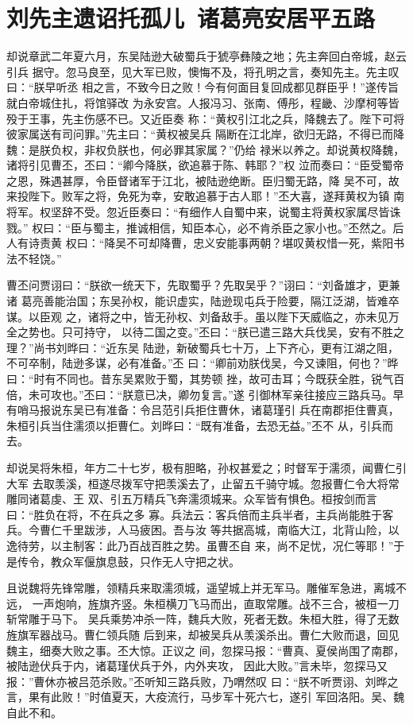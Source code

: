 \chapter{刘先主遗诏托孤儿~诸葛亮安居平五路}

却说章武二年夏六月，东吴陆逊大破蜀兵于猇亭彝陵之地；先主奔回白帝城，赵云引兵
据守。忽马良至，见大军已败，懊悔不及，将孔明之言，奏知先主。先主叹曰：“朕早听丞
相之言，不致今日之败！今有何面目复回成都见群臣乎！”遂传旨就白帝城住扎，将馆驿改
为永安宫。人报冯习、张南、傅彤，程畿、沙摩柯等皆殁于王事，先主伤感不已。又近臣奏
称：“黄权引江北之兵，降魏去了。陛下可将彼家属送有司问罪。”先主曰：“黄权被吴兵
隔断在江北岸，欲归无路，不得已而降魏：是朕负权，非权负朕也，何必罪其家属？”仍给
禄米以养之。却说黄权降魏，诸将引见曹丕，丕曰：“卿今降朕，欲追慕于陈、韩耶？”权
泣而奏曰：“臣受蜀帝之恩，殊遇甚厚，令臣督诸军于江北，被陆逊绝断。臣归蜀无路，降
吴不可，故来投陛下。败军之将，免死为幸，安敢追慕于古人耶！”丕大喜，遂拜黄权为镇
南将军。权坚辞不受。忽近臣奏曰：“有细作人自蜀中来，说蜀主将黄权家属尽皆诛戮。”
权曰：“臣与蜀主，推诚相信，知臣本心，必不肯杀臣之家小也。”丕然之。后人有诗责黄
权曰：“降吴不可却降曹，忠义安能事两朝？堪叹黄权惜一死，紫阳书法不轻饶。”

曹丕问贾诩曰：“朕欲一统天下，先取蜀乎？先取吴乎？”诩曰：“刘备雄才，更兼诸
葛亮善能治国；东吴孙权，能识虚实，陆逊现屯兵于险要，隔江泛湖，皆难卒谋。以臣观
之，诸将之中，皆无孙权、刘备敌手。虽以陛下天威临之，亦未见万全之势也。只可持守，
以待二国之变。”丕曰：“朕已遣三路大兵伐吴，安有不胜之理？”尚书刘晔曰：“近东吴
陆逊，新破蜀兵七十万，上下齐心，更有江湖之阻，不可卒制，陆逊多谋，必有准备。”丕
曰：“卿前劝朕伐吴，今又谏阻，何也？”晔曰：“时有不同也。昔东吴累败于蜀，其势顿
挫，故可击耳；今既获全胜，锐气百倍，未可攻也。”丕曰：“朕意已决，卿勿复言。”遂
引御林军亲往接应三路兵马。早有哨马报说东吴已有准备：令吕范引兵拒住曹休，诸葛瑾引
兵在南郡拒住曹真，朱桓引兵当住濡须以拒曹仁。刘晔曰：“既有准备，去恐无益。”丕不
从，引兵而去。

却说吴将朱桓，年方二十七岁，极有胆略，孙权甚爱之；时督军于濡须，闻曹仁引大军
去取羡溪，桓遂尽拨军守把羡溪去了，止留五千骑守城。忽报曹仁令大将常雕同诸葛虔、王
双、引五万精兵飞奔濡须城来。众军皆有惧色。桓按剑而言曰：“胜负在将，不在兵之多
寡。兵法云：客兵倍而主兵半者，主兵尚能胜于客兵。今曹仁千里跋涉，人马疲困。吾与汝
等共据高城，南临大江，北背山险，以逸待劳，以主制客：此乃百战百胜之势。虽曹丕自
来，尚不足忧，况仁等耶！”于是传令，教众军偃旗息鼓，只作无人守把之状。

且说魏将先锋常雕，领精兵来取濡须城，遥望城上并无军马。雕催军急进，离城不远，
一声炮响，旌旗齐竖。朱桓横刀飞马而出，直取常雕。战不三合，被桓一刀斩常雕于马下。
吴兵乘势冲杀一阵，魏兵大败，死者无数。朱桓大胜，得了无数旌旗军器战马。曹仁领兵随
后到来，却被吴兵从羡溪杀出。曹仁大败而退，回见魏主，细奏大败之事。丕大惊。正议之
间，忽探马报：“曹真、夏侯尚围了南郡，被陆逊伏兵于内，诸葛瑾伏兵于外，内外夹攻，
因此大败。”言未毕，忽探马又报：”曹休亦被吕范杀败。”丕听知三路兵败，乃喟然叹
曰：“朕不听贾诩、刘晔之言，果有此败！”时值夏天，大疫流行，马步军十死六七，遂引
军回洛阳。吴、魏自此不和。

